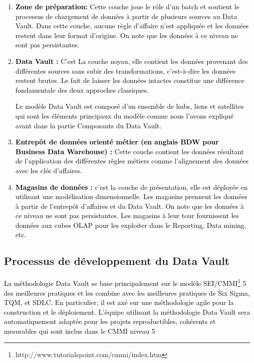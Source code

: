 \documentclass[a4paper,12pt]{report}
\begin{document}
\begin{enumerate}


\item \textcolor{black}{ \textbf{Zone de préparation:} Cette couche joue le rôle d’un batch et soutient le processus de chargement de données à partir de plusieurs sources au Data Vault. Dans cette couche, aucune règle d’affaire n’est appliquée et les données restent dans leur format d’origine. On note que les données à ce niveau ne sont pas persistantes.}

\item \textcolor{black}{ \textbf{Data Vault :}  C’est La couche noyau, elle contient les données provenant des différentes sources sans subir des transformations, c’est-à-dire les données restent brutes. Le fait de laisser les données intactes constitue une différence fondamentale des deux approches classiques.}

 \textcolor{black}{Le modèle Data Vault est composé d’un ensemble de hubs, liens et satellites qui sont les éléments principaux du modèle comme nous l’avons expliqué avant dans la partie Composants du Data Vault.}

\item \textcolor{black}{ \textbf{Entrepôt de données orienté métier (en anglais BDW pour Business Data Warehouse) :} Cette couche contient les données résultant de l’application des différentes règles métiers  comme l’alignement des données avec les clés d’affaires.}

\item \textcolor{black}{\textbf{Magasins de données :} c’est la couche de présentation, elle est déployée en utilisant une modélisation dimensionnelle. Les magasins prennent les données à partir de l’entrepôt d’affaires et du Data Vault. On note que les données à ce niveau ne sont pas persistantes. Les magasins à leur tour fournissent les données aux cubes OLAP pour les exploiter dans le Reporting, Data mining, etc.
}
\end{enumerate}


\subsection{Processus de développement du Data Vault}

\textcolor{black}{La méthodologie Data Vault se base principalement sur le modèle SEI/CMMI\footnote{http://www.tutorialspoint.com/cmmi/index.htm} 5  des meilleures pratiques et les combine avec les meilleures pratiques de Six Sigma, TQM, et SDLC. En particulier, il est axé sur une méthodologie agile pour la construction et le déploiement. 
L’équipe utilisant la méthodologie Data Vault sera automatiquement adaptée pour les projets reproductibles, cohérents et mesurables qui sont inclus dans le CMMI niveau 5}
\end{document}
